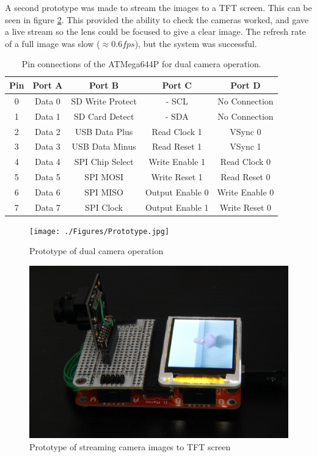 A second prototype was made to stream the images to a TFT screen. This can be seen in figure \ref{fig:Prototype:TFT}. This provided the ability to check the cameras worked, and gave a live stream so the lens could be focused to give a clear image. The refresh rate of a full image was slow ($\approx 0.6fps$), but the system was successful.

\begin{table}
\centering
\caption{Pin connections of the ATMega644P for dual camera operation.}
\label{table:644Pin}
\begin{tabular}{ccccc}\toprule
Pin	& 	Port A 	& 	Port B 			& 	Port C 				& 	Port D 		\\ \toprule
0	&	Data 0	&	SD Write Protect&	\itc - SCL			&	No Connection	\\ \midrule
1	&	Data 1	&	SD Card Detect	&	\itc - SDA			&	No Connection	\\ \midrule
2	&	Data 2	&	USB Data Plus	&	Read Clock 1		&	VSync 0			\\ \midrule
3	&	Data 3	&	USB Data Minus	&	Read Reset 1		&	VSync 1			\\ \midrule
4	&	Data 4	&	SPI Chip Select	&	Write Enable 1		&	Read Clock 0	\\ \midrule
5	&	Data 5	&	SPI	MOSI 		&	Write Reset 1		&	Read Reset 0	\\ \midrule
6	&	Data 6	&	SPI MISO		&	Output Enable 0		&	Write Enable 0	\\ \midrule
7	&	Data 7	&	SPI Clock		&	Output Enable 1		&	Write Reset 0	\\ \bottomrule
\end{tabular}
\end{table}

\begin{figure}
\texttt{[image: ./Figures/Prototype.jpg]}
\caption{Prototype of dual camera operation}
\label{fig:Prototype}
\end{figure}

\begin{figure}
\includegraphics[width=\textwidth]{./Figures/Camera_TFT.jpg}
\caption{Prototype of streaming camera images to TFT screen}
\label{fig:Prototype:TFT}
\end{figure}

